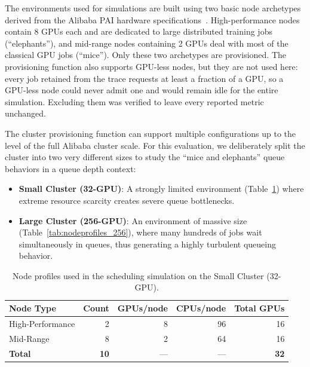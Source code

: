 The environments used for simulations are built using two basic node archetypes derived from the Alibaba PAI hardware specifications~\cite{weng2022mlaas}. High-performance nodes contain 8 GPUs each and are dedicated to large distributed training jobs (``elephants''), and mid-range nodes containing 2 GPUs deal with most of the classical GPU jobs (``mice''). Only these two archetypes are provisioned. The provisioning function also supports GPU-less nodes, but they are not used here: every job retained from the trace requests at least a fraction of a GPU, so a GPU-less node could never admit one and would remain idle for the entire simulation. Excluding them was verified to leave every reported metric unchanged.

The cluster provisioning function can support multiple configurations up to the level of the full Alibaba cluster scale. For this evaluation, we deliberately split the cluster into two very different sizes to study the ``mice and elephants'' queue behaviors in a queue depth context:

\begin{itemize}
    \item \textbf{Small Cluster (32-GPU)}: A strongly limited environment (Table~\ref{tab:nodeprofiles_32}) where extreme resource scarcity creates severe queue bottlenecks.
    \item \textbf{Large Cluster (256-GPU)}: An environment of massive size (Table~\ref{tab:nodeprofiles_256}), where many hundreds of jobs wait simultaneously in queues, thus generating a highly turbulent queueing behavior.
\end{itemize}

\begin{table}[H]
\centering
\caption[Small Cluster (32-GPU) node profiles]{Node profiles used in the scheduling simulation on the Small Cluster (32-GPU).}
\label{tab:nodeprofiles_32}
\begin{tabular}{lrrrr}
\hline
\textbf{Node Type} & \textbf{Count} & \textbf{GPUs/node} & \textbf{CPUs/node} & \textbf{Total GPUs} \\ 
\hline
High-Performance & 2  & 8  & 96 & 16 \\ 
Mid-Range        & 8  & 2  & 64 & 16 \\ 
\hline
\textbf{Total}   & \textbf{10} & --- & --- & \textbf{32} \\
\hline
\end{tabular}
\end{table}

